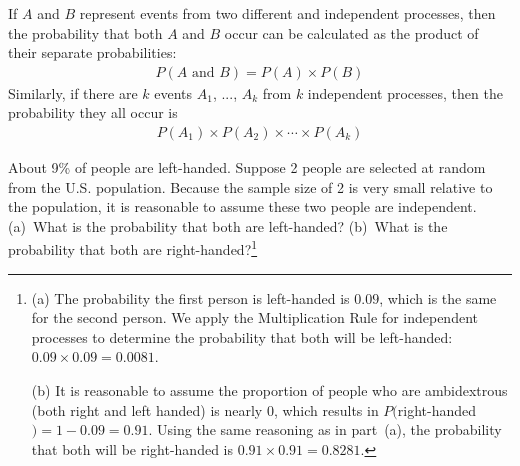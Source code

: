 \begin{termBox}{
If $A$ and $B$ represent events from two different and independent processes, then the probability that both $A$ and $B$ occur can be calculated as the product of their separate probabilities: \vspace{-1.5mm}
\begin{eqnarray}\label{eqForIndependentEvents}
P(A \text{ and }B) = P(A) \times  P(B)
\end{eqnarray}
Similarly, if there are $k$ events $A_1$, ..., $A_k$ from $k$ independent processes, then the probability they all occur is\vspace{-1.5mm}
\begin{eqnarray*}
P(A_1) \times  P(A_2)\times  \cdots \times  P(A_k)
\end{eqnarray*}\vspace{-6mm}}
\end{termBox}

\begin{exercise} \label{ex2Handedness}
About 9\% of people are left-handed. Suppose 2 people are selected at random from the U.S. population. Because the sample size of 2 is very small relative to the population, it is reasonable to assume these two people are independent. (a)~What is the probability that both are left-handed? (b)~What is the probability that both are right-handed?\footnote{(a) The probability the first person is left-handed is $0.09$, which is the same for the second person. We apply the Multiplication Rule for independent processes to determine the probability that both will be left-handed: $0.09\times 0.09 = 0.0081$.

(b) It is reasonable to assume the proportion of people who are ambidextrous (both right and left handed) is nearly 0, which results in $P($right-handed$)=1-0.09=0.91$. Using the same reasoning as in part~(a), the probability that both will be right-handed is $0.91\times 0.91 = 0.8281$.}
\end{exercise}

\textC{\newpage}

